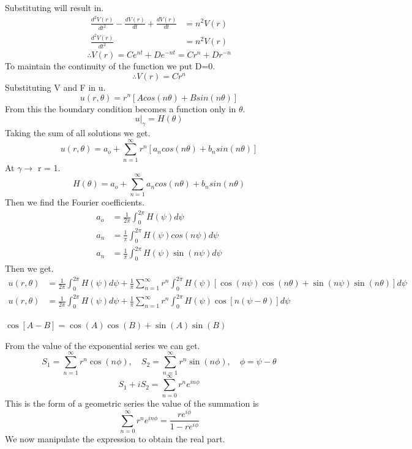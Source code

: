 \documentclass[]{article}
\begin{document}
Substituting will result in.
\begin{align*}
\frac{d^2V(r)}{dt^2}-\frac{dV(r)}{dt}+\frac{dV(r)}{dt}&=n^2V(r)
\\
\frac{d^2V(r)}{dt^2} &= n^2V(r)
\end{align*}
\[
\therefore V(r) = Ce^{nt}+De^{-nt} = Cr^n+Dr^{-n}    
\]
To maintain the continuity of the function we put D=0.
\[
\therefore V(r) = Cr^n
\]
Substituting V and F in u.
\begin{equation}
u(r,\theta) = r^n[A cos(n\theta)+B sin(n\theta)]
\end{equation}
From this the boundary condition becomes a function only in $\theta$.
\begin{equation}
u|_\gamma = H(\theta)
\end{equation}
Taking the sum of all solutions we get.
\[
    u(r,\theta) = a_o + \sum_{n=1}^{\infty} r^n[a_n cos(n\theta)+b_n sin(n\theta)]    
\]
At $\gamma \longrightarrow $ r = 1.
\[
    H(\theta) = a_o + \sum_{n=1}^{\infty} a_n cos(n\theta)+b_n sin(n\theta) 
\]
Then we find the Fourier coefficients.
\begin{align*}
a_o &= \frac{1}{2\pi}\int_{0}^{2\pi} H(\psi ) d\psi 
\\
a_n &=\frac{1}{\pi}\int_{0}^{2\pi} H(\psi ) cos(n\psi ) d\psi 
\\
a_n &=\frac{1}{\pi}\int_{0}^{2\pi} H(\psi ) \sin(n\psi ) d\psi 
\end{align*}
Then we get.
\begin{align*}
u(r,\theta) &= \frac{1}{2\pi}\int_{0}^{2\pi} H(\psi ) d\psi  + \frac{1}{\pi}\sum_{n=1}^{\infty} r^n \int_{0}^{2\pi} H(\psi )[\cos(n\psi )\cos(n\theta) + \sin(n\psi )\sin(n\theta)]d\psi 
\\
u(r,\theta) &= \frac{1}{2\pi}\int_{0}^{2\pi} H(\psi ) d\psi  + \frac{1}{\pi}\sum_{n=1}^{\infty}r^n\int_{0}^{2\pi} H(\psi )\cos[n(\psi  - \theta)]d\psi 
\end{align*}
\begin{enrichment*}{}
    $\cos[A-B] = \cos(A)\cos(B) + \sin(A)\sin(B)$
\end{enrichment*}
From the value of the exponential series we can get.
\[
    S_1 = \sum_{n=1}^{\infty} r^n \cos(n\phi),\quad S_2 =\sum_{n=1}^{\infty}r^n \sin(n\phi), \quad \phi = \psi  - \theta    
\]
\[
    S_1 + i S_2 = \sum_{n=0}^{\infty} r^n e^{in\phi}    
\]
This is the form of a geometric series the value of the summation is
\[
    \sum_{n=0}^{\infty} r^n e^{in\phi} = \frac{r e^{i\phi}}{1- r e^{i\phi}}
\]
We now manipulate the expression to obtain the real part.
\end{document}
